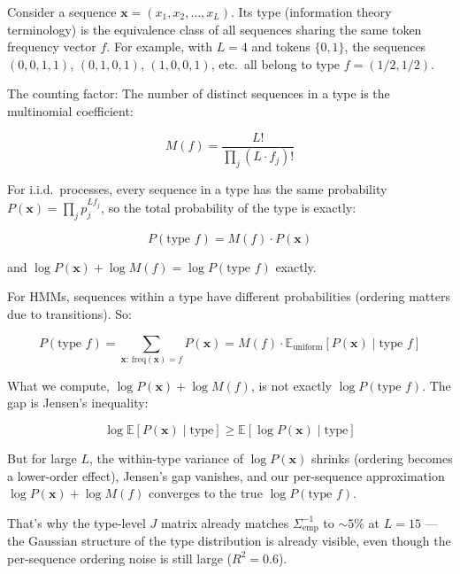 \documentclass[11pt]{article}
\begin{document}
Consider a sequence $\mathbf{x} = (x_1, x_2, \ldots, x_L)$. Its type (information theory terminology) is the equivalence class of all sequences sharing the same token frequency vector $f$. For example, with $L=4$ and tokens $\{0,1\}$, the sequences $(0,0,1,1)$, $(0,1,0,1)$, $(1,0,0,1)$, etc.\ all belong to type $f = (1/2, 1/2)$.

The counting factor: The number of distinct sequences in a type is the multinomial coefficient:

$$M(f) = \frac{L!}{\prod_j (L \cdot f_j)!}$$

For i.i.d.\ processes, every sequence in a type has the same probability $P(\mathbf{x}) = \prod_j p_j^{L f_j}$, so the total probability of the type is exactly:

$$P(\text{type } f) = M(f) \cdot P(\mathbf{x})$$

and $\log P(\mathbf{x}) + \log M(f) = \log P(\text{type } f)$ exactly.

For HMMs, sequences within a type have different probabilities (ordering matters due to transitions). So:

$$P(\text{type } f) = \sum_{\mathbf{x}:\, \text{freq}(\mathbf{x})=f} P(\mathbf{x}) = M(f) \cdot \mathbb{E}_{\text{uniform}}[P(\mathbf{x}) \mid \text{type } f]$$

What we compute, $\log P(\mathbf{x}) + \log M(f)$, is not exactly $\log P(\text{type } f)$. The gap is Jensen's inequality:

$$\log \mathbb{E}[P(\mathbf{x}) \mid \text{type}] \geq \mathbb{E}[\log P(\mathbf{x}) \mid \text{type}]$$

But for large $L$, the within-type variance of $\log P(\mathbf{x})$ shrinks (ordering becomes a lower-order effect), Jensen's gap vanishes, and our per-sequence approximation $\log P(\mathbf{x}) + \log M(f)$ converges to the true $\log P(\text{type } f)$.

That's why the type-level $J$ matrix already matches $\Sigma^{-1}_{\text{emp}}$ to ${\sim}5\%$ at $L=15$ --- the Gaussian structure of the type distribution is already visible, even though the per-sequence ordering noise is still large ($R^2 = 0.6$).
\end{document}
